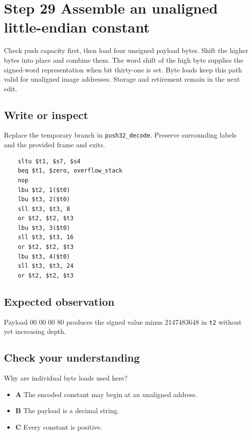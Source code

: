 \section{Step 29 Assemble an unaligned little-endian constant}\label{vm-s29}

Check push capacity first, then load four unsigned payload bytes. Shift the higher bytes into place and combine them. The word shift of the high byte supplies the signed-word representation when bit thirty-one is set. Byte loads keep this path valid for unaligned image addresses. Storage and retirement remain in the next edit.

\subsection{Write or inspect}
Replace the temporary branch in \texttt{push32\_decode}. Preserve surrounding labels and the provided frame and exits.

\begin{verbatim}
    sltu $t1, $s7, $s4
    beq $t1, $zero, overflow_stack
    nop
    lbu $t2, 1($t0)
    lbu $t3, 2($t0)
    sll $t3, $t3, 8
    or $t2, $t2, $t3
    lbu $t3, 3($t0)
    sll $t3, $t3, 16
    or $t2, $t2, $t3
    lbu $t3, 4($t0)
    sll $t3, $t3, 24
    or $t2, $t2, $t3
\end{verbatim}
\subsection{Expected observation}
Payload 00 00 00 80 produces the signed value minus 2147483648 in \texttt{t2} without yet increasing depth.

\subsection{Check your understanding}
Why are individual byte loads used here?

\begin{itemize}
  \item \textbf{A} The encoded constant may begin at an unaligned address.
  \item \textbf{B} The payload is a decimal string.
  \item \textbf{C} Every constant is positive.
\end{itemize}
